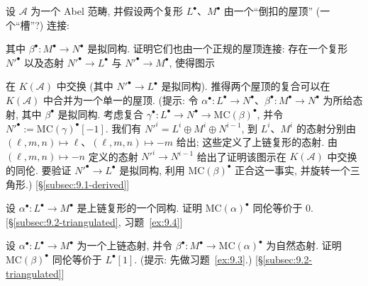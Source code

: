 \begin{prob}\label{ex:9.2}
设 $\mathcal{A}$ 为一个 Abel 范畴, 并假设两个复形 $L^\bullet$、$M^\bullet$ 由一个“倒扣的屋顶” (一个“槽”?) 连接:
\begin{center}
\end{center}
其中 $\beta^\bullet:M^\bullet\to N^\bullet$ 是拟同构. 证明它们也由一个正规的屋顶连接: 存在一个复形 $N'^\bullet$ 以及态射 $N'^\bullet\to L^\bullet$ 与 $N'^\bullet\to M^\bullet$, 使得图示
\begin{center}
\end{center}
在 $K(\mathcal{A})$ 中交换 (其中 $N'^\bullet\to L^\bullet$ 是拟同构). 推得两个屋顶的复合可以在 $K(\mathcal{A})$ 中合并为一个单一的屋顶. (提示: 令 $\alpha^\bullet:L^\bullet\to N^\bullet$、$\beta^\bullet:M^\bullet\to N^\bullet$ 为所给态射, 其中 $\beta^\bullet$ 是拟同构. 考虑复合 $\gamma^\bullet:L^\bullet\to N^\bullet\to\mathrm{MC}(\beta)^\bullet$, 并令 $N'^\bullet:=\mathrm{MC}(\gamma)^\bullet[-1]$. 我们有 $N'^i=L^i\oplus M^i\oplus N^{i-1}$, 到 $L^i$、$M^i$ 的态射分别由 $(\ell,m,n)\mapsto\ell$、$(\ell,m,n)\mapsto -m$ 给出; 这些定义了上链复形的态射. 由 $(\ell,m,n)\mapsto -n$ 定义的态射 $N'^i\to N^{i-1}$ 给出了证明该图示在 $K(\mathcal{A})$ 中交换的同伦. 要验证 $N'^\bullet\to L^\bullet$ 是拟同构, 利用 $\mathrm{MC}(\beta)^\bullet$ 正合这一事实, 并旋转一个三角形.) [\S\ref{subsec:9.1-derived}]
\end{prob}

\begin{prob}\label{ex:9.3}
设 $\alpha^\bullet:L^\bullet\to M^\bullet$ 是上链复形的一个同构. 证明 $\mathrm{MC}(\alpha)^\bullet$ 同伦等价于 $0$. [\S\ref{subsec:9.2-triangulated}, 习题~\ref{ex:9.4}]
\end{prob}

\begin{prob}\label{ex:9.4}
设 $\alpha^\bullet:L^\bullet\to M^\bullet$ 为一个上链态射, 并令 $\beta^\bullet:M^\bullet\to\mathrm{MC}(\alpha)^\bullet$ 为自然态射. 证明 $\mathrm{MC}(\beta)^\bullet$ 同伦等价于 $L^\bullet[1]$. (提示: 先做习题~\ref{ex:9.3}.) [\S\ref{subsec:9.2-triangulated}]
\end{prob}


